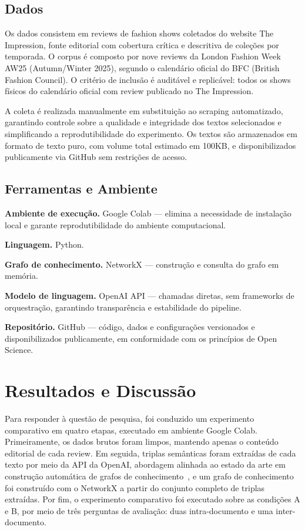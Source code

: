 \documentclass[sigconf]{acmart}
\begin{document}
\subsection{Dados}

Os dados consistem em reviews de fashion shows coletados do website The Impression, fonte editorial com cobertura crítica e descritiva de coleções por temporada. O corpus é composto por nove reviews da London Fashion Week AW25 (Autumn/Winter 2025), segundo o calendário oficial do BFC (British Fashion Council). O critério de inclusão é auditável e replicável: todos os shows físicos do calendário oficial com review publicado no The Impression.

A coleta é realizada manualmente em substituição ao scraping automatizado, garantindo controle sobre a qualidade e integridade dos textos selecionados e simplificando a reprodutibilidade do experimento. Os textos são armazenados em formato de texto puro, com volume total estimado em 100KB, e disponibilizados publicamente via GitHub sem restrições de acesso.

\subsection{Ferramentas e Ambiente}

\noindent\textbf{Ambiente de execução.} Google Colab --- elimina a necessidade de instalação local e garante reprodutibilidade do ambiente computacional.

\noindent\textbf{Linguagem.} Python.

\noindent\textbf{Grafo de conhecimento.} NetworkX --- construção e consulta do grafo em memória.

\noindent\textbf{Modelo de linguagem.} OpenAI API --- chamadas diretas, sem frameworks de orquestração, garantindo transparência e estabilidade do pipeline.

\noindent\textbf{Repositório.} GitHub --- código, dados e configurações versionados e disponibilizados publicamente, em conformidade com os princípios de Open Science.

\section{Resultados e Discussão}
\label{sec:resultados}

Para responder à questão de pesquisa, foi conduzido um experimento comparativo em quatro etapas, executado em ambiente Google Colab. Primeiramente, os dados brutos foram limpos, mantendo apenas o conteúdo editorial de cada review. Em seguida, triplas semânticas foram extraídas de cada texto por meio da API da OpenAI, abordagem alinhada ao estado da arte em construção automática de grafos de conhecimento~\cite{zhong2023}, e um grafo de conhecimento foi construído com o NetworkX a partir do conjunto completo de triplas extraídas. Por fim, o experimento comparativo foi executado sobre as condições A e B, por meio de três perguntas de avaliação: duas intra-documento e uma inter-documento.
\end{document}
